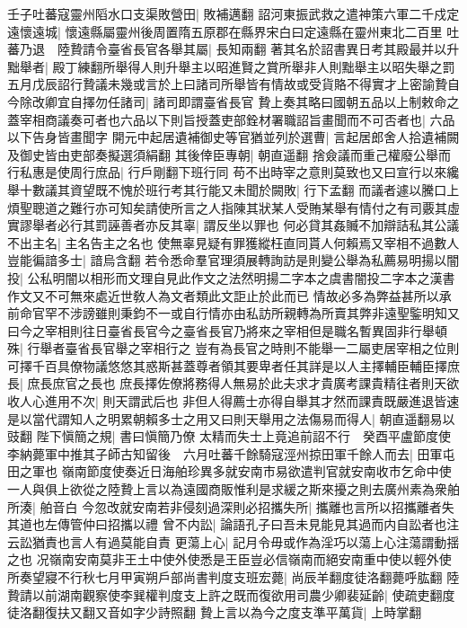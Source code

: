 壬子吐蕃寇靈州䧟水口支渠敗營田|{
	敗補邁翻}
詔河東振武救之遣神策六軍二千戍定遠懷遠城|{
	懷遠縣屬靈州後周置隋五原郡在縣界宋白曰定遠縣在靈州東北二百里}
吐蕃乃退　陸贄請令臺省長官各舉其屬|{
	長知兩翻}
著其名於詔書異日考其殿最并以升黜舉者|{
	殿丁練翻所舉得人則升舉主以昭進賢之賞所舉非人則黜舉主以昭失舉之罰}
五月戊辰詔行贄議未幾或言於上曰諸司所舉皆有情故或受貨賂不得實才上密諭贄自今除改卿宜自擇勿任諸司|{
	諸司即謂臺省長官}
贄上奏其略曰國朝五品以上制敕命之蓋宰相商議奏可者也六品以下則旨授蓋吏部銓材署職詔旨畫聞而不可否者也|{
	六品以下告身皆畫聞字}
開元中起居遺補御史等官猶並列於選曹|{
	言起居郎舍人拾遺補闕及御史皆由吏部奏擬選須絹翻}
其後倖臣專朝|{
	朝直遥翻}
捨僉議而重己權廢公舉而行私惠是使周行庶品|{
	行戶剛翻下班行同}
苟不出時宰之意則莫致也又曰宣行以來纔舉十數議其資望既不愧於班行考其行能又未聞於闕敗|{
	行下孟翻}
而議者遽以騰口上煩聖聰道之難行亦可知矣請使所言之人指陳其狀某人受賄某舉有情付之有司覈其虛實謬舉者必行其罰誣善者亦反其辜|{
	謂反坐以罪也}
何必貸其姦贓不加辯詰私其公議不出主名|{
	主名告主之名也}
使無辜見疑有罪獲縱枉直同貰人何賴焉又宰相不過數人豈能徧諳多士|{
	諳烏含翻}
若令悉命羣官理須展轉詢訪是則變公舉為私薦易明揚以闇投|{
	公私明闇以相形而文理自見此作文之法然明揚二字本之虞書闇投二字本之漢書作文又不可無來處近世敎人為文者類此文詎止於此而已}
情故必多為弊益甚所以承前命官罕不涉謗雖則秉鈞不一或自行情亦由私訪所親轉為所賣其弊非遠聖鍳明知又曰今之宰相則往日臺省長官今之臺省長官乃將來之宰相但是職名暫異固非行舉頓殊|{
	行舉者臺省長官舉之宰相行之}
豈有為長官之時則不能舉一二屬吏居宰相之位則可擇千百具僚物議悠悠其惑斯甚蓋尊者領其要卑者任其詳是以人主擇輔臣輔臣擇庶長|{
	庶長庶官之長也}
庶長擇佐僚將務得人無易於此夫求才貴廣考課貴精往者則天欲收人心進用不次|{
	則天謂武后也}
非但人得薦士亦得自舉其才然而課責既嚴進退皆速是以當代謂知人之明累朝賴多士之用又曰則天舉用之法傷易而得人|{
	朝直遥翻易以豉翻}
陛下愼簡之規|{
	書曰愼簡乃僚}
太精而失士上竟追前詔不行　癸酉平盧節度使李納薨軍中推其子師古知留後　六月吐蕃千餘騎寇涇州掠田軍千餘人而去|{
	田軍屯田之軍也}
嶺南節度使奏近日海舶珍異多就安南市易欲遣判官就安南收市乞命中使一人與俱上欲從之陸贄上言以為遠國商販惟利是求緩之斯來擾之則去廣州素為衆舶所湊|{
	舶音白}
今忽改就安南若非侵刻過深則必招攜失所|{
	攜離也言所以招攜離者失其道也左傳管仲曰招攜以禮}
曾不内訟|{
	論語孔子曰吾未見能見其過而内自訟者也注云訟猶責也言人有過莫能自責}
更蕩上心|{
	記月令毋或作為淫巧以蕩上心注蕩謂動揺之也}
况嶺南安南莫非王土中使外使悉是王臣豈必信嶺南而絕安南重中使以輕外使所奏望寢不行秋七月甲寅朔戶部尚書判度支班宏薨|{
	尚辰羊翻度徒洛翻薨呼肱翻}
陸贄請以前湖南觀察使李巽權判度支上許之既而復欲用司農少卿裴延齡|{
	使疏吏翻度徒洛翻復扶又翻又音如字少詩照翻}
贄上言以為今之度支準平萬貨|{
	上時掌翻}
